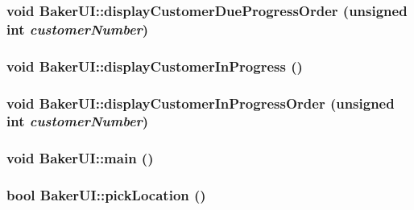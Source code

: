\hypertarget{class_baker_u_i_9afa245c6153335e553d88f8e7ad2c2e}{
\subsubsection[displayCustomerDueProgressOrder]{\setlength{\rightskip}{0pt plus 5cm}void Baker\-UI::display\-Customer\-Due\-Progress\-Order (unsigned int {\em customer\-Number})}}
\label{class_baker_u_i_9afa245c6153335e553d88f8e7ad2c2e}


\hypertarget{class_baker_u_i_49612691d8a1c466378d3e4507aff847}{
\subsubsection[displayCustomerInProgress]{\setlength{\rightskip}{0pt plus 5cm}void Baker\-UI::display\-Customer\-In\-Progress ()}}
\label{class_baker_u_i_49612691d8a1c466378d3e4507aff847}


\hypertarget{class_baker_u_i_12edcb5c93a8a60d06b8c9de906c4be0}{
\subsubsection[displayCustomerInProgressOrder]{\setlength{\rightskip}{0pt plus 5cm}void Baker\-UI::display\-Customer\-In\-Progress\-Order (unsigned int {\em customer\-Number})}}
\label{class_baker_u_i_12edcb5c93a8a60d06b8c9de906c4be0}


\hypertarget{class_baker_u_i_ea83b916b3f52eec32ae6d54d59b4453}{
\subsubsection[main]{\setlength{\rightskip}{0pt plus 5cm}void Baker\-UI::main ()}}
\label{class_baker_u_i_ea83b916b3f52eec32ae6d54d59b4453}


\hypertarget{class_baker_u_i_74d0d6b7d7493e8a9703bc8fbeb79f2e}{
\subsubsection[pickLocation]{\setlength{\rightskip}{0pt plus 5cm}bool Baker\-UI::pick\-Location ()}}
\label{class_baker_u_i_74d0d6b7d7493e8a9703bc8fbeb79f2e}




